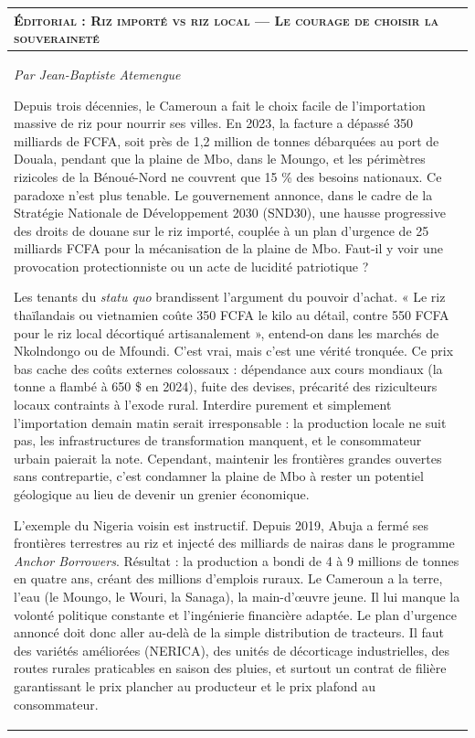 \documentclass[11pt]{article}
\begin{document}
\begin{center}
\begin{tabularx}{\linewidth}{|X|}\hline
\rowcolor{popblueL}
\textbf{\textsc{Éditorial : Riz importé vs riz local — Le courage de choisir la souveraineté}} \\ \hline
\emph{Par Jean-Baptiste Atemengue}

Depuis trois décennies, le Cameroun a fait le choix facile de l'importation massive de riz pour nourrir ses villes. En 2023, la facture a dépassé 350 milliards de FCFA, soit près de 1,2 million de tonnes débarquées au port de Douala, pendant que la plaine de Mbo, dans le Moungo, et les périmètres rizicoles de la Bénoué-Nord ne couvrent que 15 \% des besoins nationaux. Ce paradoxe n'est plus tenable. Le gouvernement annonce, dans le cadre de la Stratégie Nationale de Développement 2030 (SND30), une hausse progressive des droits de douane sur le riz importé, couplée à un plan d'urgence de 25 milliards FCFA pour la mécanisation de la plaine de Mbo. Faut-il y voir une provocation protectionniste ou un acte de lucidité patriotique ?

Les tenants du \emph{statu quo} brandissent l'argument du pouvoir d'achat. « Le riz thaïlandais ou vietnamien coûte 350 FCFA le kilo au détail, contre 550 FCFA pour le riz local décortiqué artisanalement », entend-on dans les marchés de Nkolndongo ou de Mfoundi. C'est vrai, mais c'est une vérité tronquée. Ce prix bas cache des coûts externes colossaux : dépendance aux cours mondiaux (la tonne a flambé à 650 \$ en 2024), fuite des devises, précarité des riziculteurs locaux contraints à l'exode rural. Interdire purement et simplement l'importation demain matin serait irresponsable : la production locale ne suit pas, les infrastructures de transformation manquent, et le consommateur urbain paierait la note. Cependant, maintenir les frontières grandes ouvertes sans contrepartie, c'est condamner la plaine de Mbo à rester un potentiel géologique au lieu de devenir un grenier économique.

L'exemple du Nigeria voisin est instructif. Depuis 2019, Abuja a fermé ses frontières terrestres au riz et injecté des milliards de nairas dans le programme \emph{Anchor Borrowers}. Résultat : la production a bondi de 4 à 9 millions de tonnes en quatre ans, créant des millions d'emplois ruraux. Le Cameroun a la terre, l'eau (le Moungo, le Wouri, la Sanaga), la main-d'œuvre jeune. Il lui manque la volonté politique constante et l'ingénierie financière adaptée. Le plan d'urgence annoncé doit donc aller au-delà de la simple distribution de tracteurs. Il faut des variétés améliorées (NERICA), des unités de décorticage industrielles, des routes rurales praticables en saison des pluies, et surtout un contrat de filière garantissant le prix plancher au producteur et le prix plafond au consommateur.


\end{tabularx}
\end{center}
\end{document}
